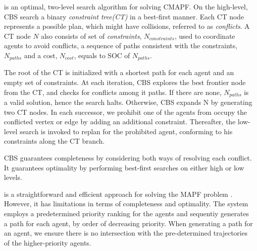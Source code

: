 \documentclass[letterpaper]{article} %
\def\
UrlFont{\rm}  %
\newcommand{\roni}[1]{\textbf{[\color{orange}RONI:#1]}}
\theoremstyle{definition}
\begin{document}

 \cite{sharon2015conflict} is an optimal, two-level search algorithm for solving CMAPF. On the high-level, CBS search a binary \emph{constraint tree(CT)} in a best-first manner. Each CT node represents a possible plan, which might have collisions, referred to as \emph{conflicts}. A CT node $N$ also consists of set of \emph{constraints}, $N_{constraints}$, used to coordinate agents to avoid conflicts, a sequence of paths consistent with the constraints, $N_{paths}$ and a cost, $N_{cost}$, equals to SOC of $N_{paths}$.

The root of the CT is initialized with a shortest path for each agent and an empty set of constraints. At each iteration, CBS explores the best frontier node from the CT, and checks for conflicts among it paths. If there are none, $N_{paths}$ is a valid solution, hence the search halts. Otherwise, CBS expands N by generating two CT nodes. In each successor, we prohibit one of the agents from occupy the conflicted vertex or edge by adding an additional constraint. Thereafter, the low-level search is invoked to replan for the prohibited agent, conforming to  his constraints along the CT branch.

CBS guarantees completeness by considering both ways of resolving each conflict. It guarantees optimality by performing best-first searches on either high or low levels.

 is a straightforward and efficient approach for solving the MAPF problem \cite{silver2005cooperative}. However, it has limitations in terms of completeness and optimality. The system employs a predetermined priority ranking for the agents and sequentiy generates a path for each agent, by order of decreasing priority. When generating a path for an agent, we ensure there is no intersection with the pre-determined trajectories of the higher-priority agents.
\end{document}
